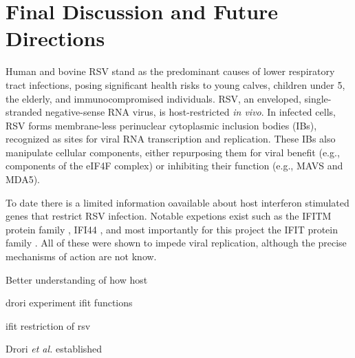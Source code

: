 \chapter{Final Discussion and Future Directions}
Human and bovine RSV stand as the predominant causes of lower respiratory tract infections, posing significant health risks to young calves, children under 5, the elderly, and immunocompromised individuals. RSV, an enveloped, single-stranded negative-sense RNA virus, is host-restricted \textit{in vivo}. In infected cells, RSV forms membrane-less perinuclear cytoplasmic inclusion bodies (IBs), recognized as sites for viral RNA transcription and replication. These IBs also manipulate cellular components, either repurposing them for viral benefit (e.g., components of the eIF4F complex) or inhibiting their function (e.g., MAVS and MDA5).

To date there is a limited information oavailable about host interferon stimulated genes that restrict RSV infection. Notable expetions exist such as the IFITM protein family \cite{Smith2019Interferon-InducedMembrane}, IFI44 \cite{McDonald2016ADisease, Li2021IdentificationVirus}, and most importantly for this project the IFIT protein family \cite{Drori2020InfluenzaProteins}. All of these were shown to impede viral replication, although the precise mechanisms of action are not know. 

Better understanding of how host 

drori experiment
ifit functions

ifit restriction of rsv

Drori \textit{et al.} established


